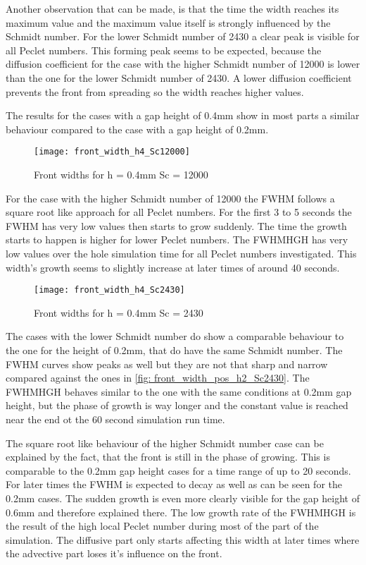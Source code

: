 \documentclass[../thesis.tex]{subfiles}
\begin{document}
Another observation that can be made, is that the time the width reaches its maximum value and the maximum value itself is strongly influenced by the Schmidt number. For the lower Schmidt number of 2430 a clear peak is visible for all Peclet numbers. This forming peak seems to be expected, because the diffusion coefficient for the case with the higher Schmidt number of 12000 is lower than the one for the lower Schmidt number of 2430. A lower diffusion coefficient prevents the front from spreading so the width reaches higher values.
\newline

The results for the cases with a gap height of 0.4mm show in most parts a similar behaviour compared to the case with a gap height of 0.2mm.
\begin{figure}[htb]
	\centering
	\texttt{[image: front\_width\_h4\_Sc12000]}
	\caption{Front widths for  h = 0.4mm Sc = 12000
	\label{fig: front_width_h4_Sc12000}}
\end{figure}
For the case with the higher Schmidt number of 12000 the FWHM follows a square root like approach for all Peclet numbers. For the first 3 to 5 seconds the FWHM has very low values then starts to grow suddenly. The time the growth starts to happen is higher for lower Peclet numbers. The FWHMHGH has very low values over the hole simulation time for all Peclet numbers investigated. This width's growth seems to slightly increase at later times of around 40 seconds.
\begin{figure}[htb]
	\centering
	\texttt{[image: front\_width\_h4\_Sc2430]}
	\caption{Front widths for  h = 0.4mm Sc = 2430
		\label{fig: front_width_pos_h4_Sc2430}}
\end{figure}

The cases with the lower Schmidt number do show a comparable behaviour to the one for the height of 0.2mm, that do have the same Schmidt number. The FWHM curves show peaks as well but they are not that sharp and narrow compared against the ones in \autoref{fig: front_width_pos_h2_Sc2430}. The FWHMHGH behaves similar to the one with the same conditions at 0.2mm gap height, but the phase of growth is way longer and the constant value is reached near the end ot the 60 second simulation run time.

The square root like behaviour of the higher Schmidt number case can be explained by the fact, that the front is still in the phase of growing. This is comparable to the 0.2mm gap height cases for a time range of up to 20 seconds. For later times the FWHM is expected to decay as well as can be seen for the 0.2mm cases. The sudden growth is even more clearly visible for the gap height of 0.6mm and therefore explained there. The low growth rate of the FWHMHGH is the result of the high local Peclet number during most of the part of the simulation. The diffusive part only starts affecting this width at later times where the advective part loses it's influence on the front.
\end{document}
